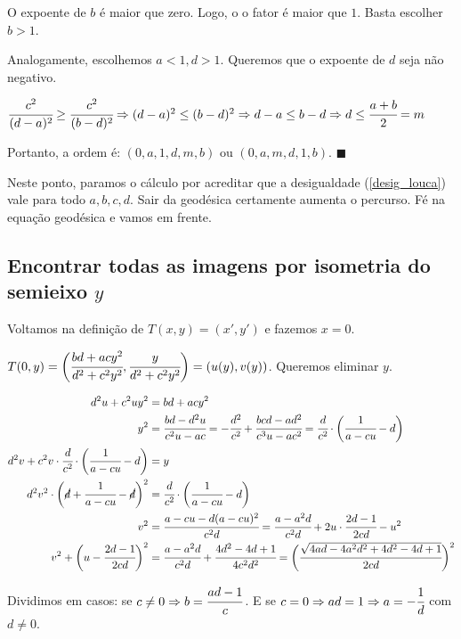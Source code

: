 \documentclass[10pt,a4paper]{article}
\begin{document}
		O expoente de $b$ \'e maior que zero. Logo, o o fator \'e maior que $1$. Basta escolher $b > 1$.

		Analogamente, escolhemos $a < 1, d > 1$. Queremos que o expoente de $d$ seja n\~ao negativo.

		$\cfrac{c^2}{(d-a)^2} \ge \cfrac{c^2}{(b-d)^2} \Rightarrow (d-a)^2 \le (b-d)^2 \Rightarrow d - a \le b - d \Rightarrow d \le \cfrac{a + b}{2} = m$

		Portanto, a ordem \'e: $(0, a, 1, d, m, b)$ ou $(0, a, m, d, 1, b).\,\,\blacksquare$

		Neste ponto, paramos o c\'alculo por acreditar que a desigualdade (\ref{desig_louca}) vale para todo $a,b,c,d$. Sair da geod\'esica certamente aumenta o percurso. F\'e na equa\c{c}\~ao geod\'esica e vamos em frente.

		\subsection{Encontrar todas as imagens por isometria do semieixo $y$}
		\begin{flushright}
		\end{flushright}

		Voltamos na defini\c{c}\~ao de $T(x,y) = (x', y')$ e fazemos $x = 0$.

		$T(0,y) = \bigg( \cfrac{bd + acy^2}{d^2 + c^2 y^2}, \cfrac{y}{d^2 + c^2 y^2} \bigg) = (u(y), v(y))$. Queremos eliminar $y$.

		\begin{align*}
			d^2 u + c^2 u y^2 &= bd + acy^2 \\
			y^2 &= \cfrac{bd - d^2 u}{c^2 u - ac} = -\cfrac{d^2}{c^2} + \cfrac{bcd - ad^2}{c^3 u - ac^2} = \cfrac{d}{c^2} \cdot \bigg( \cfrac{1}{a - c u} - d\bigg) \\
			d^2 v + c^2 v \cdot \cfrac{d}{c^2} \cdot \bigg( \cfrac{1}{a - c u} - d\bigg) &= y \\
			d^2 v^2 \cdot \bigg( \cancel{d} +  \cfrac{1}{a - c u} - \cancel{d} \bigg)^2 &= \cfrac{d}{c^2} \cdot \bigg( \cfrac{1}{a - c u} - d\bigg) \\
			v^2 &= \cfrac{a - c u - d (a - cu)^2}{c^2 d} = \cfrac{a - a^2 d}{c^2 d} + 2u \cdot \cfrac{2d - 1}{2cd} - u^2 \\
			v^2 + \bigg(u - \cfrac{2d - 1}{2cd} \bigg)^2 &= \cfrac{a - a^2 d}{c^2 d} + \cfrac{4d^2 - 4d + 1}{4c^2d^2} = \bigg( \cfrac{\sqrt{4ad - 4a^2 d^2 + 4d^2 - 4d + 1}}{2cd} \bigg)^2
		\end{align*}

		Dividimos em casos: se $c \ne 0 \Rightarrow b = \cfrac{ad - 1}{c}\,$. E se $c = 0 \Rightarrow ad = 1 \Rightarrow a = -\cfrac{1}{d}$ com $d \ne 0$.
\end{document}
